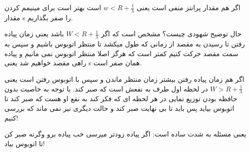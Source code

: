 \documentclass{article}[12pt]
\begin{document}
اگر هم مقدار پرانتز منفی است یعنی 
$ w < R + \frac{1}{\lambda}$
است بهتر است برای مینیمم کردن مقدار 
s 
 را صفر بگذاریم. 
 
 حال توضیح شهودی چیست؟
 مشخص است که اگر 
 $W < R + \frac{1}{\lambda}$
 باشد یعنی زمان پیاده رفتن تا رسیدن به مقصد از زمانی که طول میکشد تا منتظر اتوبوس باشیم و سپس به سمت مقصد حرکت کنیم کمتر است که هرگز اصلا منتظر اتوبوس نمی مانیم و پیاده راهی مقصد خواهیم شد یعنی 
 s
 همان صفر است. 
 
 اگر هم زمان پیاده رفتن بیشتر زمان منتظر ماندن و سپس با اتوبوس رفتن است 
 یعنی
 $W > R + \frac{1}{\lambda}$
 در لحظه اول طرف به نفعش است که صبر کند. با توجه به خاصیت بدون حافظه بودن توزیع نمایی 
 در هر لحظه ای که فکر کند به نفع او هست که صبر کند تا اتوبوس بیاید پس باید تا بی نهایت صبر کند و حالت دیگری نیز نمی ماند که بررسی کنیم! 
 
 یعنی مسئله به شدت ساده است: اگر پیاده زودتر میرسی خب پیاده برو وگرنه صبر کن تا اتوبوس بیاد! 
 
\end{document}
